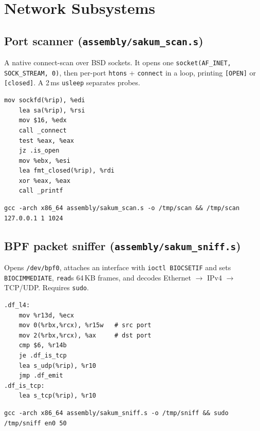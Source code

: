\section{Network Subsystems}\label{ch:net}

\subsection{Port scanner (\texttt{assembly/sakum\_scan.s})}

A native connect-scan over BSD sockets.  It opens one
\texttt{socket(AF\_INET, SOCK\_STREAM, 0)}, then per-port
\texttt{htons} + \texttt{connect} in a loop, printing \texttt{[OPEN]} or
\texttt{[closed]}.  A 2\,ms \texttt{usleep} separates probes.

\begin{lstlisting}[language=SakumAsm,caption={Connect probe (sakum\_scan.s:99).}]
    mov sockfd(%rip), %edi
    lea sa(%rip), %rsi
    mov $16, %edx
    call _connect
    test %eax, %eax
    jz .is_open
    mov %ebx, %esi
    lea fmt_closed(%rip), %rdi
    xor %eax, %eax
    call _printf
\end{lstlisting}

\begin{verbatim}
gcc -arch x86_64 assembly/sakum_scan.s -o /tmp/scan && /tmp/scan 127.0.0.1 1 1024
\end{verbatim}

\subsection{BPF packet sniffer (\texttt{assembly/sakum\_sniff.s})}

Opens \texttt{/dev/bpf0}, attaches an interface with
\texttt{ioctl BIOCSETIF} and sets \texttt{BIOCIMMEDIATE}, \texttt{read}s
64\,KB frames, and decodes Ethernet $\to$ IPv4 $\to$ TCP/UDP.  Requires
\texttt{sudo}.

\begin{lstlisting}[language=SakumAsm,caption={L4 dispatch (sakum\_sniff.s:189).}]
.df_l4:
    mov %r13d, %ecx
    mov 0(%rbx,%rcx), %r15w   # src port
    mov 2(%rbx,%rcx), %ax     # dst port
    cmp $6, %r14b
    je .df_is_tcp
    lea s_udp(%rip), %r10
    jmp .df_emit
.df_is_tcp:
    lea s_tcp(%rip), %r10
\end{lstlisting}

\begin{verbatim}
gcc -arch x86_64 assembly/sakum_sniff.s -o /tmp/sniff && sudo /tmp/sniff en0 50
\end{verbatim}
